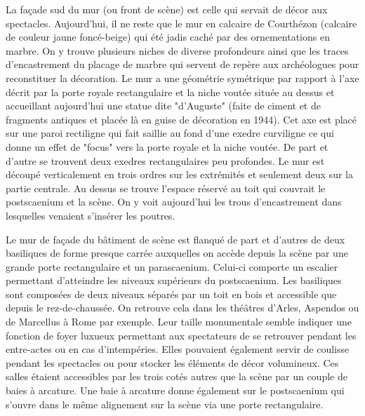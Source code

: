		La façade sud du mur (ou front de scène) est celle qui servait de décor aux spectacles. Aujourd'hui, il ne reste que le mur en calcaire de Courthézon (calcaire de couleur jaune foncé-beige) qui été jadis caché par des ornementations en marbre. On y trouve plusieurs niches de diverse profondeurs ainsi que les traces d'encastrement du placage de marbre qui servent de repère aux archéologues pour reconstituer la décoration. Le mur a une géométrie symétrique par rapport à l'axe décrit par la porte royale rectangulaire et la niche voutée située au dessus et accueillant aujourd'hui une statue dite "d'Auguste" (faite de ciment et de fragments antiques et placée là en guise de décoration en 1944). Cet axe est placé sur une paroi rectiligne qui fait saillie au fond d'une \gls{exedre} curviligne ce qui donne un effet de "focus" vers la porte royale et la niche voutée. De part et d'autre se trouvent deux  \glspl{exedre} rectangulaires peu profondes. Le mur est découpé verticalement en trois ordres sur les extrémités et seulement deux sur la partie centrale. Au dessus se trouve l'espace réservé au toit qui couvrait le \gls{postscaenium} et la scène. On y voit aujourd'hui les trous d'encastrement dans lesquelles venaient s'insérer les poutres.
		
		Le mur de façade du bâtiment de scène est flanqué de part et d'autres de deux \glspl{basilique} de forme presque carrée auxquelles on accède depuis la scène par une grande porte rectangulaire et un \gls{parascaenium}. Celui-ci comporte un escalier permettant d'atteindre les niveaux supérieurs du \gls{postscaenium}. Les \glspl{basilique} sont composées de deux niveaux séparés par un toit en bois et accessible que depuis le rez-de-chaussée. On retrouve cela dans les théâtres d'Arles, Aspendos ou de Marcellus à Rome par exemple. Leur taille monumentale semble indiquer une fonction de foyer luxueux permettant aux spectateurs de se retrouver pendant les entre-actes ou en cas d'intempéries. Elles pouvaient également servir de coulisse pendant les spectacles ou pour stocker les éléments de décor volumineux. Ces salles étaient accessibles par les trois cotés autres que la scène par un couple de baies à arcature. Une baie à arcature donne également sur le postscaenium qui s'ouvre dans le même alignement sur la scène via une porte rectangulaire.
		

